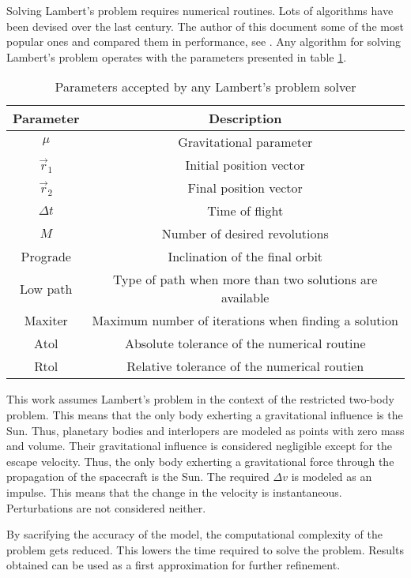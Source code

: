 Solving Lambert's problem requires numerical routines. Lots of algorithms have
been devised over the last century. The author of this document some of the most
popular ones and compared them in performance, see \cite{martinez2021}. Any
algorithm for solving Lambert's problem operates with the parameters presented
in table \ref{tab:lambert-parameters}.

\vspace{1cm}
\begin{table}[H]
  \centering
  \begin{tabular}{|c|c|}
    \hline
    Parameter   & Description                                             \\
    \hline
    $\mu$       & Gravitational parameter                                 \\
    $\vec{r}_1$ & Initial position vector                                 \\
    $\vec{r}_2$ & Final position vector                                   \\
    $\Delta t$  & Time of flight                                          \\
    $M$         & Number of desired revolutions                           \\
    Prograde    & Inclination of the final orbit                          \\
    Low path    & Type of path when more than two solutions are available \\
    Maxiter     & Maximum number of iterations when finding a solution    \\
    Atol        & Absolute tolerance of the numerical routine             \\
    Rtol        & Relative tolerance of the numerical routien             \\
    \hline
  \end{tabular}
  \caption{Parameters accepted by any Lambert's problem solver}
  \label{tab:lambert-parameters}
\end{table}

This work assumes Lambert's problem in the context of the restricted two-body
problem. This means that the only body exherting a gravitational influence is
the Sun. Thus, planetary bodies and interlopers are modeled as points with zero
mass and volume. Their gravitational influence is considered negligible except
for the escape velocity. Thus, the only body exherting a gravitational force
through the propagation of the spacecraft is the Sun. The required $\Delta v$ is
modeled as an impulse. This means that the change in the velocity is
instantaneous. Perturbations are not considered neither.

By sacrifying the accuracy of the model, the computational complexity of the
problem gets reduced. This lowers the time required to solve the problem.
Results obtained can be used as a first approximation for further refinement.
